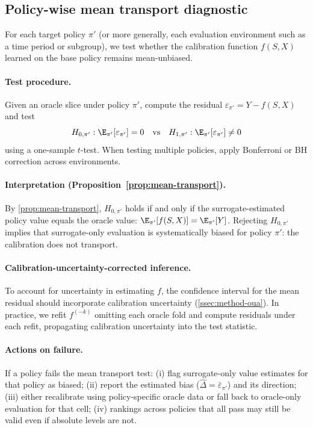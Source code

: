 \subsection{Policy-wise mean transport diagnostic}
\label{app:diag-transport}

For each target policy $\pi'$ (or more generally, each evaluation environment such as a time period or subgroup), we test whether the calibration function $f(S,X)$ learned on the base policy remains mean-unbiased.

\paragraph{Test procedure.}
Given an oracle slice under policy $\pi'$, compute the residual $\varepsilon_{\pi'} = Y - f(S,X)$ and test
\[
H_{0,\pi'}: \E_{\pi'}[\varepsilon_{\pi'}] = 0 \quad \text{vs} \quad H_{1,\pi'}: \E_{\pi'}[\varepsilon_{\pi'}] \neq 0
\]
using a one-sample $t$-test. When testing multiple policies, apply Bonferroni or BH correction across environments.

\paragraph{Interpretation (Proposition~\ref{prop:mean-transport}).}
By \cref{prop:mean-transport}, $H_{0,\pi'}$ holds if and only if the surrogate-estimated policy value equals the oracle value: $\E_{\pi'}[f(S,X)] = \E_{\pi'}[Y]$. Rejecting $H_{0,\pi'}$ implies that surrogate-only evaluation is systematically biased for policy $\pi'$: the calibration does not transport.

\paragraph{Calibration-uncertainty-corrected inference.}
To account for uncertainty in estimating $f$, the confidence interval for the mean residual should incorporate calibration uncertainty (\cref{ssec:method-oua}). In practice, we refit $f^{(-k)}$ omitting each oracle fold and compute residuals under each refit, propagating calibration uncertainty into the test statistic.

\paragraph{Actions on failure.}
If a policy fails the mean transport test:
(i) flag surrogate-only value estimates for that policy as biased;
(ii) report the estimated bias ($\hat\Delta = \bar\varepsilon_{\pi'}$) and its direction;
(iii) either recalibrate using policy-specific oracle data or fall back to oracle-only evaluation for that cell;
(iv) rankings across policies that all pass may still be valid even if absolute levels are not.

